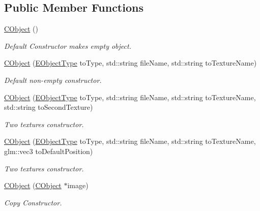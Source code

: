 \subsection*{Public Member Functions}
\begin{DoxyCompactItemize}
\item 
\mbox{\hyperlink{classkrizpav6_1_1_c_object_acb2174ed42bcb9f05c3779456f73b5c6}{C\+Object}} ()
\begin{DoxyCompactList}\small\item\em Default Constructor makes empty object. \end{DoxyCompactList}\item 
\mbox{\hyperlink{classkrizpav6_1_1_c_object_a43e1e9dcf69f2571502ea701031a1589}{C\+Object}} (\mbox{\hyperlink{classkrizpav6_1_1_c_object_a54fa6c9a881bd5b3e1b4bc606444997f}{E\+Object\+Type}} to\+Type, std\+::string file\+Name, std\+::string to\+Texture\+Name)
\begin{DoxyCompactList}\small\item\em Default non-\/empty constructor. \end{DoxyCompactList}\item 
\mbox{\hyperlink{classkrizpav6_1_1_c_object_a3968b61c37ac9bc582826b0f1c170703}{C\+Object}} (\mbox{\hyperlink{classkrizpav6_1_1_c_object_a54fa6c9a881bd5b3e1b4bc606444997f}{E\+Object\+Type}} to\+Type, std\+::string file\+Name, std\+::string to\+Texture\+Name, std\+::string to\+Second\+Texture)
\begin{DoxyCompactList}\small\item\em Two textures constructor. \end{DoxyCompactList}\item 
\mbox{\hyperlink{classkrizpav6_1_1_c_object_aa142aa155c59f68e988a6315ad793d6d}{C\+Object}} (\mbox{\hyperlink{classkrizpav6_1_1_c_object_a54fa6c9a881bd5b3e1b4bc606444997f}{E\+Object\+Type}} to\+Type, std\+::string file\+Name, std\+::string to\+Texture\+Name, glm\+::vec3 to\+Default\+Position)
\begin{DoxyCompactList}\small\item\em Two textures constructor. \end{DoxyCompactList}\item 
\mbox{\hyperlink{classkrizpav6_1_1_c_object_a233da8b38ad40481a943e7380b13ed0d}{C\+Object}} (\mbox{\hyperlink{classkrizpav6_1_1_c_object}{C\+Object}} $\ast$image)
\begin{DoxyCompactList}\small\item\em Copy Constructor. \end{DoxyCompactList}\item 

\end{DoxyCompactItemize}
